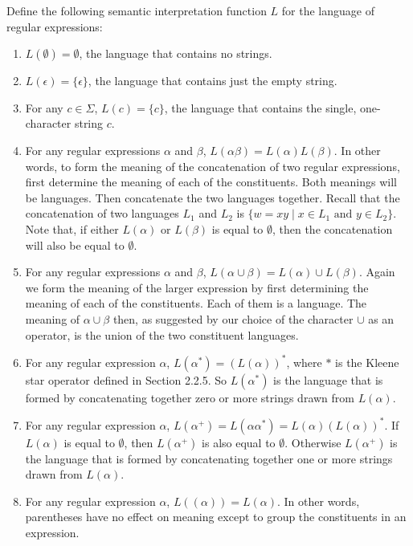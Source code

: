 \documentclass[hidelinks,12pt]{article}
\begin{document}
Define the following semantic interpretation function \( L \) for the language of regular expressions:

\begin{enumerate}
    \item \( L(\emptyset) = \emptyset \), the language that contains no strings.
    \item \( L(\epsilon) = \{\epsilon\} \), the language that contains just the empty string.
    \item For any \( c \in \Sigma \), \( L(c) = \{c\} \), the language that contains the single, one-character string \( c \).
    \item For any regular expressions \( \alpha \) and \( \beta \), \( L(\alpha \beta) = L(\alpha) L(\beta) \). In other words, to form the meaning of the concatenation of two regular expressions, first determine the meaning of each of the constituents. Both meanings will be languages. Then concatenate the two languages together. Recall that the concatenation of two languages \( L_1 \) and \( L_2 \) is \( \{ w = xy \mid x \in L_1 \text{ and } y \in L_2 \} \). Note that, if either \( L(\alpha) \) or \( L(\beta) \) is equal to \( \emptyset \), then the concatenation will also be equal to \( \emptyset \).
    \item For any regular expressions \( \alpha \) and \( \beta \), \( L(\alpha \cup \beta) = L(\alpha) \cup L(\beta) \). Again we form the meaning of the larger expression by first determining the meaning of each of the constituents. Each of them is a language. The meaning of \( \alpha \cup \beta \) then, as suggested by our choice of the character \( \cup \) as an operator, is the union of the two constituent languages.
    \item For any regular expression \( \alpha \), \( L(\alpha^*) = (L(\alpha))^* \), where \( * \) is the Kleene star operator defined in Section 2.2.5. So \( L(\alpha^*) \) is the language that is formed by concatenating together zero or more strings drawn from \( L(\alpha) \).
    \item For any regular expression \( \alpha \), \( L(\alpha^+) = L(\alpha \alpha^*) = L(\alpha) (L(\alpha))^* \). If \( L(\alpha) \) is equal to \( \emptyset \), then \( L(\alpha^+) \) is also equal to \( \emptyset \). Otherwise \( L(\alpha^+) \) is the language that is formed by concatenating together one or more strings drawn from \( L(\alpha) \).
    \item For any regular expression \( \alpha \), \( L((\alpha)) = L(\alpha) \). In other words, parentheses have no effect on meaning except to group the constituents in an expression.
\end{enumerate}
\end{document}
